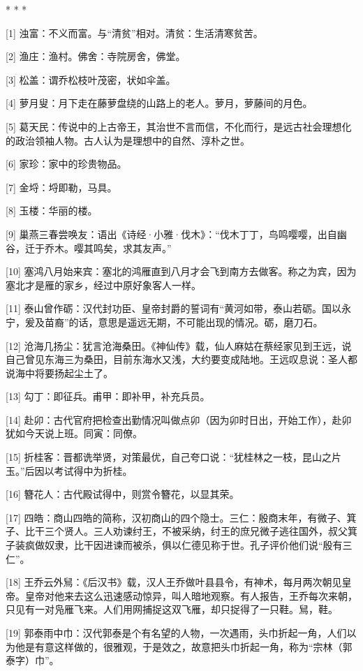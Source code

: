 \documentclass[12pt,UTF8]{ctexbook}
\begin{document}
* * *



[1] 浊富：不义而富。与“清贫”相对。清贫：生活清寒贫苦。

[2] 渔庄：渔村。佛舍：寺院房舍，佛堂。

[3] 松盖：谓乔松枝叶茂密，状如伞盖。

[4] 萝月叟：月下走在藤萝盘绕的山路上的老人。萝月，萝藤间的月色。

[5] 葛天民：传说中的上古帝王，其治世不言而信，不化而行，是远古社会理想化的政治领袖人物。古人认为是理想中的自然、淳朴之世。

[6] 家珍：家中的珍贵物品。

[7] 金埒：埒即勒，马具。

[8] 玉楼：华丽的楼。

[9] 巢燕三春尝唤友：语出《诗经·小雅·伐木》：“伐木丁丁，鸟鸣嘤嘤，出自幽谷，迁于乔木。嘤其鸣矣，求其友声。”

[10] 塞鸿八月始来宾：塞北的鸿雁直到八月才会飞到南方去做客。称之为宾，因为塞北才是雁的家乡，经过中原好象客人一样。

[11] 泰山曾作砺：汉代封功臣、皇帝封爵的誓词有“黄河如带，泰山若砺。国以永宁，爰及苗裔”的话，意思是遥远无期，不可能出现的情况。砺，磨刀石。

[12] 沧海几扬尘：犹言沧海桑田。《神仙传》载，仙人麻姑在蔡经家见到王远，说自己曾见东海三为桑田，目前东海水又浅，大约要变成陆地。王远叹息说：圣人都说海中将要扬起尘土了。

[13] 勾丁：即征兵。甫甲：即补甲，补充兵员。

[14] 赴卯：古代官府把检查出勤情况叫做点卯（因为卯时日出，开始工作），赴卯犹如今天说上班。同寅：同僚。

[15] 折桂客：晋都诜举贤，对策最优，自己夸口说：“犹桂林之一枝，昆山之片玉。”后因以考试得中为折桂。

[16] 簪花人：古代殿试得中，则赏令簪花，以显其荣。

[17] 四皓：商山四皓的简称，汉初商山的四个隐士。三仁：殷商末年，有微子、箕子、比干三个贤人。三人劝谏纣王，不被采纳，纣王的庶兄微子逃往国外，叔父箕子装疯做奴隶，比干因进谏而被杀，俱以仁德见称于世。孔子评价他们说“殷有三仁”。

[18] 王乔云外舃：《后汉书》载，汉人王乔做叶县县令，有神术，每月两次朝见皇帝。皇帝对他来去这么迅速感动惊异，叫人暗地观察。有人报告，王乔每次来朝，只见有一对凫雁飞来。人们用网捕捉这双飞雁，却只捉得了一只鞋。舃，鞋。

[19] 郭泰雨中巾：汉代郭泰是个有名望的人物，一次遇雨，头巾折起一角，人们以为他是有意这样做的，很雅观，于是效之，故意把头巾折起一角，称为“宗林（郭泰字）巾”。
\end{document}
